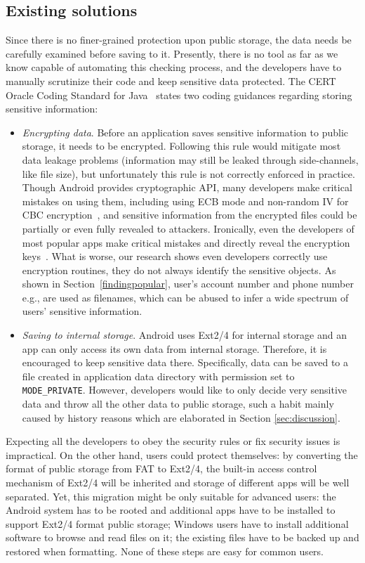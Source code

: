 \documentclass{sig-alternate}
\begin{document}
\subsection{Existing solutions}
Since there is no finer-grained protection upon public storage, the data needs be carefully examined before saving to it. Presently, there is no tool as far as we know capable of automating this checking process, and the developers have to manually scrutinize their code and keep sensitive data protected. The CERT Oracle Coding Standard for Java~\cite{long2011cert} states two coding guidances regarding storing sensitive information:
\begin{itemize}
\item \textit{Encrypting data}. Before an application saves sensitive information to public storage, it needs to be encrypted. Following this rule would mitigate most data leakage problems (information may still be leaked through side-channels, like file size), but unfortunately this rule is not correctly enforced in practice. Though Android provides cryptographic API, many developers make critical mistakes on using them, including using ECB mode and non-random IV for CBC encryption~\cite{egele2013empirical}, and sensitive information from the encrypted files could be partially or even fully revealed to attackers. Ironically, even the developers of most popular apps make critical mistakes and directly reveal the encryption keys~\cite{whatsappuserchat}. What is worse, our research shows even developers correctly use encryption routines, they do not always identify the sensitive objects. As shown in Section~\ref{findingpopular}, user's account number and phone number e.g., are used as filenames, which can be abused to infer a wide spectrum of users' sensitive information.
\item \textit{Saving to internal storage}. Android uses Ext2/4 for internal storage and an app can only access its own data from internal storage. Therefore, it is encouraged to keep sensitive data there. Specifically, data can be saved to a file created in application data directory with permission set to \texttt{MODE\_PRIVATE}. However, developers would like to only decide very sensitive data and throw all the other data to public storage, such a habit mainly caused by history reasons which are elaborated in Section \ref{sec:discussion}.
\end{itemize}



Expecting all the developers to obey the security rules or fix security issues is impractical. On the other hand, users could protect themselves: by converting the format of public storage from FAT to Ext2/4, the built-in access control mechanism of Ext2/4 will be inherited and storage of different apps will be well separated. Yet, this migration might be only suitable for advanced users: the Android system has to be rooted and additional apps have to be installed to support Ext2/4 format public storage; Windows users have to install additional software to browse and read files on it; the existing files have to be backed up and restored when formatting. None of these steps are easy for common users.
\end{document}
